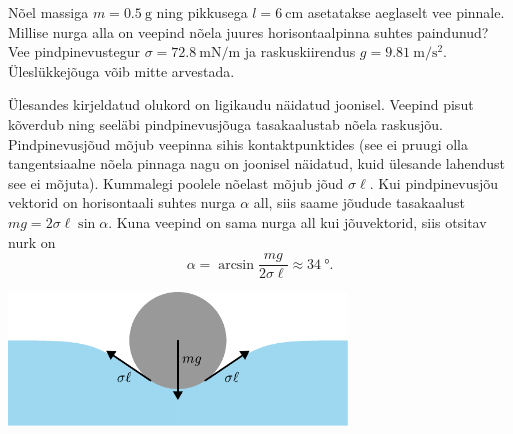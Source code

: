 
Nõel massiga $m=\SI{0.5}{\g}$ ning pikkusega $l=\SI{6}{\cm}$ asetatakse aeglaselt vee pinnale. Millise nurga alla on veepind nõela juures horisontaalpinna suhtes paindunud? Vee pindpinevustegur $\sigma=\SI{72.8}{\mN\per\m}$ ja raskuskiirendus $g=\SI{9.81}{\m\per\s\squared}$. Üleslükkejõuga võib mitte arvestada.


\hint

\solu
\par
Ülesandes kirjeldatud olukord on ligikaudu näidatud joonisel. Veepind pisut kõverdub ning seeläbi pindpinevusjõuga tasakaalustab nõela raskusjõu. Pindpinevusjõud mõjub veepinna sihis kontaktpunktides (see ei pruugi olla tangentsiaalne nõela pinnaga nagu on joonisel näidatud, kuid ülesande lahendust see ei mõjuta). Kummalegi poolele nõelast mõjub jõud $\sigma \ell$. Kui pindpinevusjõu vektorid on horisontaali suhtes nurga $\alpha$ all, siis saame jõudude tasakaalust \(mg = 2 \sigma \ell \sin \alpha\). Kuna veepind on sama nurga all kui jõuvektorid, siis otsitav nurk on
\[
\alpha = \arcsin{\frac{mg}{2\sigma \ell}} \approx \SI{34}{\degree}.
\]
\begin{center}
  \includegraphics[width=9cm]{2023-v3g-06-sol.pdf}
\end{center}
\probend